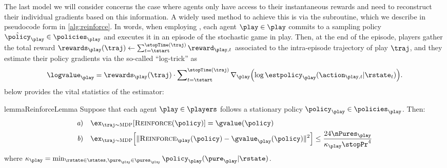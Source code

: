 \begin{model}
\label{mod:value}
The last model we will consider concerns the case where agents only have access to their instantaneous rewards and need to reconstruct their individual gradients based on this information.
A widely used method to achieve this is via the \reinforce subroutine, which we describe in pseudocode form in \cref{alg:reinforce}.
In words, when employing \reinforce, each agent $\play\in\play$ commits to a sampling policy $\hat\policy_{\play}\in\policies_{\play}$ and executes it in an episode of the stochastic game in play.
Then, at the end of the episode, players gather the total reward $\rewards_\play\parens{\traj} \leftarrow \sum_{\time=\tstart}^{\stopTime\parens{\traj}}\reward_{\play,\time}$ associated to the intra-episode trajectory of play $\traj$, and they estimate their policy gradients via the so-called ``log-trick''  \cite{williams1992simple} as
\begin{equation}
\label{eq:logtrick}
\logvalue_\play
	= \rewards_\play\parens{\traj}
		\cdot \sum\nolimits_{\time=\tstart}^{\stopTime\parens{\traj}} \nabla_{\play}
			\parens*{\log\estpolicy_\play\parens{\action_{\play,\time}|\rstate_\time}}.
\end{equation}
 below provides the vital statistics of the \reinforce estimator:

\begin{restatable}{lemma}{ReinforceLemma}
\label{lem:reinforce}
Suppose that each agent $\play\in\players$ follows a stationary policy $\policy_{\play} \in \policies_{\play}$.
Then:
\begin{subequations}
\label{eq:reinforce}
\begin{flalign}
\quad
\text{\itshape a\upshape)}
	\quad
	&\ex_{\traj \sim \MDP}\bracks*{\reinforce(\policy)}
		= \gvalue(\policy)
		&
	\\
\quad
\text{\itshape b\upshape)}
	\quad
	&\ex_{\traj \sim \MDP} \bracks*{\norm{\reinforce_\play(\policy)-\gvalue_\play(\policy)}^2}
		\leq \dfrac{24\nPures_{\play}}{\kappa_\play \stopPr^4}
		&
\end{flalign}
\end{subequations}
where $\kappa_\play = \min_{\rstate\in\states,\pure_{\play}\in\pures_{\play}} \policy_\play(\pure_\play \vert \rstate)$.
\end{restatable}


\end{model}
